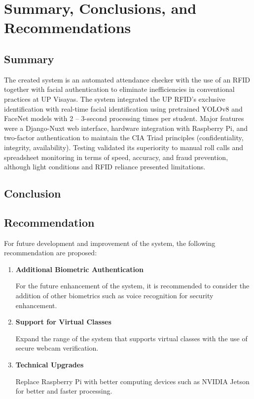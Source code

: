 \chapter{Summary, Conclusions, and Recommendations}

\section{Summary}

	The created system is an automated attendance checker with the use of an RFID together with facial authentication to eliminate inefficiencies in conventional practices at UP Visayas. The system integrated the UP RFID's exclusive identification with real-time facial identification using pretrained YOLOv8 and FaceNet models with 2 – 3-second processing times per student. Major features were a Django-Nuxt web interface, hardware integration with Raspberry Pi, and two-factor authentication to maintain the CIA Triad principles (confidentiality, integrity, availability). Testing validated its superiority to manual roll calls and spreadsheet monitoring in terms of speed, accuracy, and fraud prevention, although light conditions and RFID reliance presented limitations.

\section{Conclusion}

\section{Recommendation}
	For future development and improvement of the system, the following recommendation are proposed:
	
	\begin{enumerate}
		\item \textbf{Additional Biometric Authentication}
	
		For the future enhancement of the system, it is recommended to consider the addition of other biometrics such as voice recognition for security enhancement.
		
		\item \textbf{Support for Virtual Classes}
		
		Expand the range of the system that supports virtual classes with the use of secure webcam verification.
		
		\item \textbf{Technical Upgrades}
		
		Replace Raspberry Pi with better computing devices such as NVIDIA Jetson for better and faster processing.
		
	\end{enumerate}
	